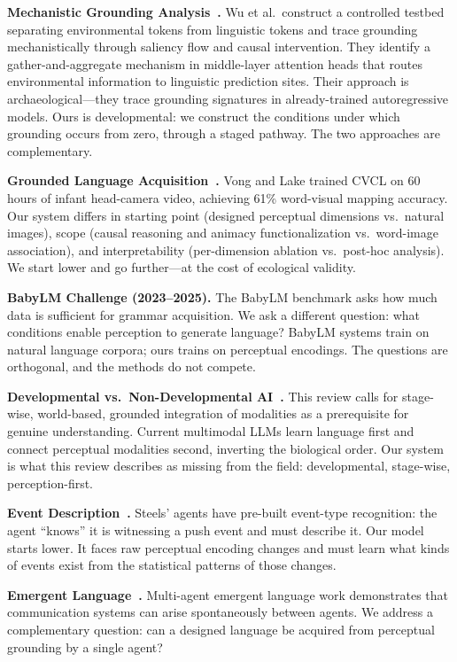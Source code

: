 \documentclass{article}
\begin{document}
\textbf{Mechanistic Grounding Analysis~\citep{wu2025}.} Wu et al.\ construct a controlled testbed separating environmental tokens from linguistic tokens and trace grounding mechanistically through saliency flow and causal intervention. They identify a gather-and-aggregate mechanism in middle-layer attention heads that routes environmental information to linguistic prediction sites. Their approach is archaeological---they trace grounding signatures in already-trained autoregressive models. Ours is developmental: we construct the conditions under which grounding occurs from zero, through a staged pathway. The two approaches are complementary.

\textbf{Grounded Language Acquisition~\citep{vong2024}.} Vong and Lake trained CVCL on 60 hours of infant head-camera video, achieving 61\% word-visual mapping accuracy. Our system differs in starting point (designed perceptual dimensions vs.\ natural images), scope (causal reasoning and animacy functionalization vs.\ word-image association), and interpretability (per-dimension ablation vs.\ post-hoc analysis). We start lower and go further---at the cost of ecological validity.

\textbf{BabyLM Challenge (2023--2025).} The BabyLM benchmark asks how much data is sufficient for grammar acquisition. We ask a different question: what conditions enable perception to generate language? BabyLM systems train on natural language corpora; ours trains on perceptual encodings. The questions are orthogonal, and the methods do not compete.

\textbf{Developmental vs.\ Non-Developmental AI~\citep{farkas2025}.} This review calls for stage-wise, world-based, grounded integration of modalities as a prerequisite for genuine understanding. Current multimodal LLMs learn language first and connect perceptual modalities second, inverting the biological order. Our system is what this review describes as missing from the field: developmental, stage-wise, perception-first.

\textbf{Event Description~\citep{steels2012}.} Steels' agents have pre-built event-type recognition: the agent ``knows'' it is witnessing a push event and must describe it. Our model starts lower. It faces raw perceptual encoding changes and must learn what kinds of events exist from the statistical patterns of those changes.

\textbf{Emergent Language~\citep{lazaridou2020}.} Multi-agent emergent language work demonstrates that communication systems can arise spontaneously between agents. We address a complementary question: can a designed language be acquired from perceptual grounding by a single agent?
\end{document}
